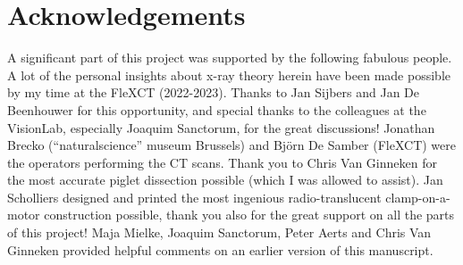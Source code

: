 \section{Acknowledgements}
\label{sec:orge05c94b}
A significant part of this project was supported by the following fabulous people.
A lot of the personal insights about x-ray theory herein have been made possible by my time at the FleXCT (2022-2023). Thanks to Jan Sijbers and Jan De Beenhouwer for this opportunity, and special thanks to the colleagues at the VisionLab, especially Joaquim Sanctorum, for the great discussions!
Jonathan Brecko (``naturalscience'' museum Brussels) and Björn De Samber (FleXCT) were the operators performing the CT scans.
Thank you to Chris Van Ginneken for the most accurate piglet dissection possible (which I was allowed to assist).
Jan Scholliers designed and printed the most ingenious radio-translucent clamp-on-a-motor construction possible, thank you also for the great support on all the parts of this project!
Maja Mielke, Joaquim Sanctorum, Peter Aerts and Chris Van Ginneken provided helpful comments on an earlier version of this manuscript.
